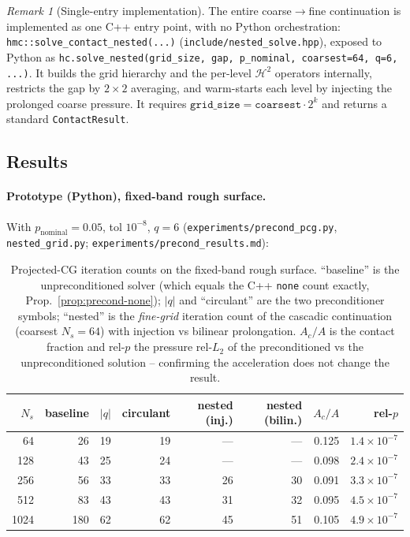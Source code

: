 \documentclass[11pt,a4paper]{article}
\newcommand{\abs}[1]{\left\lvert #1 \right\rvert}
\newcommand{\Htwo}{\mathcal{H}^2}
\newcommand{\code}[1]{\texttt{#1}}
\theoremstyle{definition}
\theoremstyle{remark}
\newtheorem{remark}{Remark}
\begin{document}
\begin{remark}[Single-entry implementation]
\label{rem:nested-api}
The entire coarse$\to$fine continuation is implemented as one C++ entry point,
with no Python orchestration: \code{hmc::solve\_contact\_nested(...)}
(\code{include/nested\_solve.hpp}), exposed to Python as
\code{hc.solve\_nested(grid\_size, gap, p\_nominal, coarsest=64, q=6, ...)}.
It builds the grid hierarchy and the per-level $\Htwo$ operators internally,
restricts the gap by $2\times2$ averaging, and warm-starts each level by
injecting the prolonged coarse pressure. It requires
$\texttt{grid\_size}=\texttt{coarsest}\cdot2^{k}$ and returns a standard
\code{ContactResult}.
\end{remark}

\subsection{Results}
\label{sec:accel-results}

\paragraph{Prototype (Python), fixed-band rough surface.}
With $p_{\text{nominal}}=0.05$, tol $10^{-8}$, $q=6$
(\code{experiments/precond\_pcg.py}, \code{nested\_grid.py};
\code{experiments/precond\_results.md}):

\begin{table}[h]
\centering
\begin{tabular}{rrrrrrrr}
\toprule
$N_s$ & baseline & $\abs{q}$ & circulant & nested (inj.) & nested (bilin.)
& $A_c/A$ & rel-$p$ \\
\midrule
64   & 26  & 19 & 19 & ---  & ---  & 0.125 & $1.4\times10^{-7}$ \\
128  & 43  & 25 & 24 & ---  & ---  & 0.098 & $2.4\times10^{-7}$ \\
256  & 56  & 33 & 33 & 26   & 30   & 0.091 & $3.3\times10^{-7}$ \\
512  & 83  & 43 & 43 & 31   & 32   & 0.095 & $4.5\times10^{-7}$ \\
1024 & 180 & 62 & 62 & 45   & 51   & 0.105 & $4.9\times10^{-7}$ \\
\bottomrule
\end{tabular}
\caption{Projected-CG iteration counts on the fixed-band rough surface.
``baseline'' is the unpreconditioned solver (which equals the C++ \code{none}
count exactly, Prop.~\ref{prop:precond-none}); $\abs{q}$ and ``circulant'' are
the two preconditioner symbols; ``nested'' is the \emph{fine-grid} iteration count
of the cascadic continuation (coarsest $N_s{=}64$) with injection vs bilinear
prolongation. $A_c/A$ is the contact fraction and rel-$p$ the pressure rel-$L_2$
of the preconditioned vs the unpreconditioned solution -- confirming the
acceleration does not change the result.}
\label{tab:precond-it}
\end{table}
\end{document}
